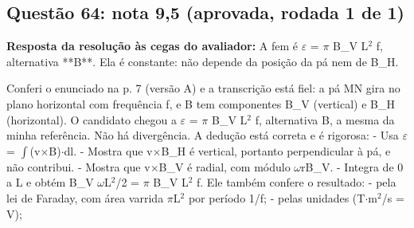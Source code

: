 \documentclass{article}%
\begin{document}
\subsection*{Questão 64: nota 9,5 (aprovada, rodada 1 de 1)}%
\textbf{Resposta da resolução às cegas do avaliador:} A fem é $\varepsilon$ = $\pi$ B\_V L$^2$ f, alternativa **B**. Ela é constante: não depende da posição da pá nem de B\_H.\par %
Conferi o enunciado na p. 7 (versão A) e a transcrição está fiel: a pá MN gira no plano horizontal com frequência f, e B tem componentes B\_V (vertical) e B\_H (horizontal). O candidato chegou a $\varepsilon$ = $\pi$ B\_V L$^2$ f, alternativa B, a mesma da minha referência. Não há divergência.\newline%
\newline%
A dedução está correta e é rigorosa:\newline%
{-} Usa $\varepsilon$ = $\int$(v$\times$B)$\cdot$dl.\newline%
{-} Mostra que v$\times$B\_H é vertical, portanto perpendicular à pá, e não contribui.\newline%
{-} Mostra que v$\times$B\_V é radial, com módulo $\omega$rB\_V.\newline%
{-} Integra de 0 a L e obtém B\_V $\omega$L$^2$/2 = $\pi$ B\_V L$^2$ f.\newline%
\newline%
Ele também confere o resultado:\newline%
{-} pela lei de Faraday, com área varrida $\pi$L$^2$ por período 1/f;\newline%
{-} pelas unidades (T$\cdot$m$^2$/s = V);\newline%
\end{document}
